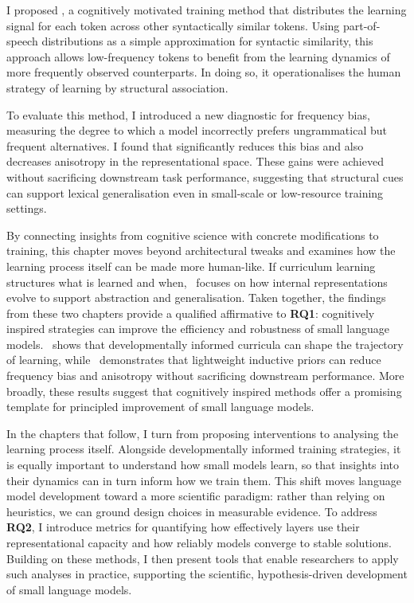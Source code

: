 I proposed \smoothing, a cognitively motivated training method that distributes the learning signal for each token across other syntactically similar tokens. Using part-of-speech distributions as a simple approximation for syntactic similarity, this approach allows low-frequency tokens to benefit from the learning dynamics of more frequently observed counterparts. In doing so, it operationalises the human strategy of learning by structural association.

To evaluate this method, I introduced a new diagnostic for frequency bias, measuring the degree to which a model incorrectly prefers ungrammatical but frequent alternatives. I found that \smoothing significantly reduces this bias and also decreases anisotropy in the representational space. These gains were achieved without sacrificing downstream task performance, suggesting that structural cues can support lexical generalisation even in small-scale or low-resource training settings.

By connecting insights from cognitive science with concrete modifications to training, this chapter moves beyond architectural tweaks and examines how the learning process itself can be made more human-like. If curriculum learning structures what is learned and when, \smoothing\ focuses on how internal representations evolve to support abstraction and generalisation. Taken together, the findings from these two chapters provide a qualified affirmative to \textbf{RQ1}: cognitively inspired strategies can improve the efficiency and robustness of small language models. \climb\ shows that developmentally informed curricula can shape the trajectory of learning, while \smoothing\ demonstrates that lightweight inductive priors can reduce frequency bias and anisotropy without sacrificing downstream performance. More broadly, these results suggest that cognitively inspired methods offer a promising template for principled improvement of small language models.

In the chapters that follow, I turn from proposing interventions to analysing the learning process itself. Alongside developmentally informed training strategies, it is equally important to understand how small models learn, so that insights into their dynamics can in turn inform how we train them. This shift moves language model development toward a more scientific paradigm: rather than relying on heuristics, we can ground design choices in measurable evidence. To address \textbf{RQ2}, I introduce metrics for quantifying how effectively layers use their representational capacity and how reliably models converge to stable solutions. Building on these methods, I then present tools that enable researchers to apply such analyses in practice, supporting the scientific, hypothesis-driven development of small language models.





